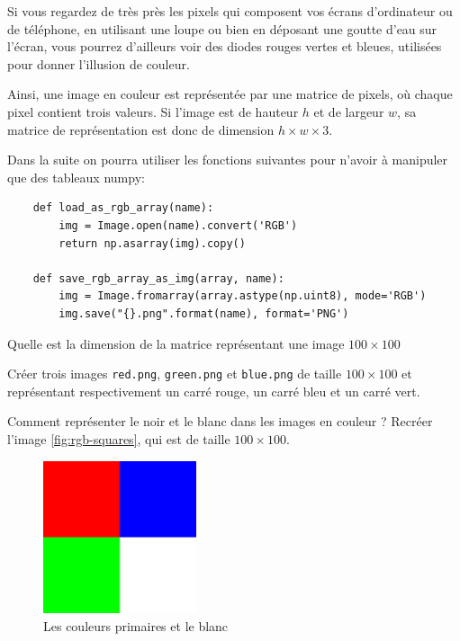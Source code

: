 Si vous regardez de très près les pixels qui composent vos écrans d'ordinateur ou de téléphone, en utilisant une loupe ou bien en déposant une goutte d'eau sur l'écran, vous pourrez d'ailleurs voir des diodes rouges vertes et bleues, utilisées pour donner l'illusion de couleur.

Ainsi, une image en couleur est représentée par une matrice de pixels, où chaque pixel contient trois valeurs. Si l'image est de hauteur $ h $ et de largeur $ w $, sa matrice de représentation est donc de dimension $ h \times w \times 3 $.

Dans la suite on pourra utiliser les fonctions suivantes pour n'avoir à manipuler que des tableaux numpy:

\begin{verbatim}
    def load_as_rgb_array(name):
        img = Image.open(name).convert('RGB')
        return np.asarray(img).copy()

    def save_rgb_array_as_img(array, name):
        img = Image.fromarray(array.astype(np.uint8), mode='RGB')
        img.save("{}.png".format(name), format='PNG')
\end{verbatim}

\quessques Quelle est la dimension de la matrice représentant une image $ 100 \times 100 $

\quessques Créer trois images \texttt{red.png}, \texttt{green.png} et \texttt{blue.png} de taille $ 100 \times 100 $ et représentant respectivement un carré rouge, un carré bleu et un carré vert.

\ssques Comment représenter le noir et le blanc dans les images en couleur ? Recréer l'image \autoref{fig:rgb-squares}, qui est de taille $ 100 \times 100 $.

\begin{figure}[h!]
    \begin{center}
        \includegraphics[width=0.4\textwidth]{figures/11/rgb-squares.png}
    \end{center}
    \caption{Les couleurs primaires et le blanc}
    \label{fig:rgb-squares}
\end{figure}


